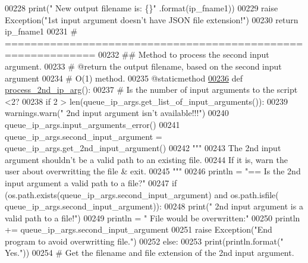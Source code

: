 \begin{DoxyCode}
00228             print(\textcolor{stringliteral}{" New output filename is: \{\}"} .format(ip\_fname1))
00229             \textcolor{keywordflow}{raise} Exception(\textcolor{stringliteral}{"1st input argument doesn't have JSON file extension!"})
00230         \textcolor{keywordflow}{return} ip\_fname1
00231     \textcolor{comment}{# ============================================================}
00232     \textcolor{comment}{##  Method to process the second input argument.}
00233     \textcolor{comment}{#   @return the output filename, based on the second input argument}
00234     \textcolor{comment}{#   O(1) method.}
00235     @staticmethod
\hypertarget{queue__ip__arguments_8py_source_l00236}{}\hyperlink{classutilities_1_1queue__ip__arguments_1_1queue__ip__args_a82d245379c48196f61d4268882dd5c6d}{00236}     \textcolor{keyword}{def }\hyperlink{classutilities_1_1queue__ip__arguments_1_1queue__ip__args_a82d245379c48196f61d4268882dd5c6d}{process\_2nd\_ip\_arg}():
00237         \textcolor{comment}{#   Is the number of input arguments to the script <2?}
00238         \textcolor{keywordflow}{if} 2 > len(queue\_ip\_args.get\_list\_of\_input\_arguments()):
00239             warnings.warn(\textcolor{stringliteral}{" 2nd input argument isn't available!!!"})
00240             queue\_ip\_args.input\_arguments\_error()
00241         queue\_ip\_args.second\_input\_argument = queue\_ip\_args.get\_2nd\_input\_argument()
00242         \textcolor{stringliteral}{"""}
00243 \textcolor{stringliteral}{        The 2nd input argument shouldn't be a valid path to an existing file.}
00244 \textcolor{stringliteral}{        If it is, warn the user about overwritting the file & exit.}
00245 \textcolor{stringliteral}{        """}
00246         println = \textcolor{stringliteral}{"==   Is the 2nd input argument a valid path to a file?"}
00247         \textcolor{keywordflow}{if} (os.path.exists(queue\_ip\_args.second\_input\_argument) \textcolor{keywordflow}{and} os.path.isfile(
      queue\_ip\_args.second\_input\_argument)):
00248             print(\textcolor{stringliteral}{" 2nd input argument is a valid path to a file!"})
00249             println = \textcolor{stringliteral}{" File would be overwritten:"}
00250             println += queue\_ip\_args.second\_input\_argument
00251             \textcolor{keywordflow}{raise} Exception(\textcolor{stringliteral}{"End program to avoid overwritting file."})
00252         \textcolor{keywordflow}{else}:
00253             print(println.format(\textcolor{stringliteral}{"  Yes."}))
00254         \textcolor{comment}{#   Get the filename and file extension of the 2nd input argument.}

\end{DoxyCode}
